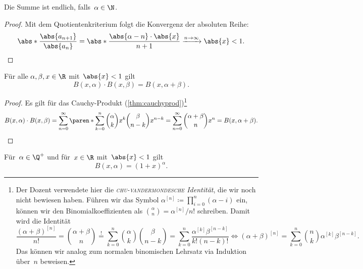 \documentclass[a4paper]{article}
\begin{document}
Die Summe ist endlich, falls~$\alpha \in \N$.

\begin{proof}
    Mit dem Quotientenkriterium folgt die Konvergenz der absoluten Reihe:
    \begin{equation*}
        \abs*{\frac{\abs{a_{n+1}}}{\abs{a_n}}} = \abs*{\frac{\abs{\alpha-n} \cdot \abs{x}}{n+1}} \xrightarrow{n\to\infty} \abs{x} < 1. \qedhere
    \end{equation*}
\end{proof}

\begin{lemma}
    Für alle $\alpha,\beta,x \in \R$ mit~$\abs{x} < 1$ gilt
    \begin{equation*}
        B(x,\alpha) \cdot B(x,\beta) = B(x,\alpha+\beta).
    \end{equation*}
\end{lemma}

\begin{proof}
    Es gilt für das Cauchy-Produkt (\cref{thm:cauchyprod})\footnote{Der Dozent verwendete hier die \emph{\textsc{chu}-\textsc{vandermondesche} Identität}, die wir noch nicht bewiesen haben. Führen wir das Symbol $\alpha^{[n]} \coloneqq \prod_{i=0}^n (\alpha-i)$ ein, können wir den Binomialkoeffizienten als $\binom{\alpha}{n} = \alpha^{[n]}/n!$ schreiben. Damit wird die Identität
        \begin{equation*}
            \frac{(\alpha+\beta)^{[n]}}{n!}= \binom{\alpha+\beta}{n} \overset{!}{=} \sum_{k=0}^n \binom{\alpha}{k}\binom{\beta}{n-k} = \sum_{k=0}^n \frac{\alpha^{[k]} \beta^{[n-k]}}{k!(n-k)!} \iff (\alpha+\beta)^{[n]} = \sum_{k=0}^n \binom{n}{k} \alpha^{[k]} \beta^{[n-k]}.
        \end{equation*}
        Das können wir analog zum normalen binomischen Lehrsatz via Induktion über~$n$ beweisen.}
    \begin{equation*}
        B(x,\alpha) \cdot B(x,\beta) = \sum_{n=0}^\infty \paren*{\sum_{k=0}^n \binom{\alpha}{k} x^k \binom{\beta}{n-k} x^{n-k}} = \sum_{n=0}^\infty \binom{\alpha+\beta}{n} x^n = B(x,\alpha+\beta). \qedhere
    \end{equation*}
\end{proof}

\begin{theorem}
    Für~$\alpha \in \Q^+$ und für~$x \in \R$ mit~$\abs{x} < 1$ gilt
    \begin{equation*}
        B(x,\alpha) = (1+x)^\alpha.
    \end{equation*}
\end{theorem}
\end{document}
